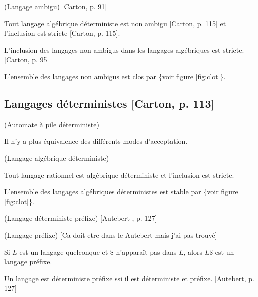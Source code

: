 \documentclass[../../agregation.tex]{subfiles}
\begin{document}
\begin{defn}
	(Langage ambigu) {[}Carton, p. 91{]}
\end{defn}

\begin{prop}
	Tout langage algébrique déterministe est non ambigu {[}Carton, p.
	115{]} et l'inclusion est stricte {[}Carton, p. 115{]}.
\end{prop}

\begin{prop}
	L'inclusion des langages non ambigus dans les langages algébriques
	est stricte. {[}Carton, p. 95{]}
\end{prop}

\begin{prop}
	L'ensemble des langages non ambigus est clos par \{voir figure \ref{fig:clot}\}.
\end{prop}

\subsection{Langages déterministes {[}Carton, p. 113{]}}

\begin{defn}
	(Automate à pile déterministe)\end{defn}
\begin{rem}
	Il n'y a plus équivalence des différents modes d'acceptation.
\end{rem}
\begin{defn}
	(Langage algébrique déterministe)\end{defn}
\begin{prop}
	Tout langage rationnel est algébrique déterministe et l'inclusion
	est stricte.
\end{prop}

\begin{prop}
	L'ensemble des langages algébriques déterministes est stable par \{voir
	figure \ref{fig:clot}\}.\end{prop}
\begin{defn}
	(Langage déterministe préfixe) {[}Autebert , p. 127{]}
\end{defn}

\begin{defn}
	(Langage préfixe) {[}Ca doit etre dans le Autebert mais j'ai pas trouvé{]}\end{defn}
\begin{rem}
	Si $L$ est un langage quelconque et $\$$ n'apparaît pas dans $L$,
	alors $L\$$ est un langage préfixe.\end{rem}
\begin{prop}
	Un langage est déterministe préfixe ssi il est déterministe et préfixe.
	{[}Autebert, p. 127{]}
\end{prop}
\end{document}

